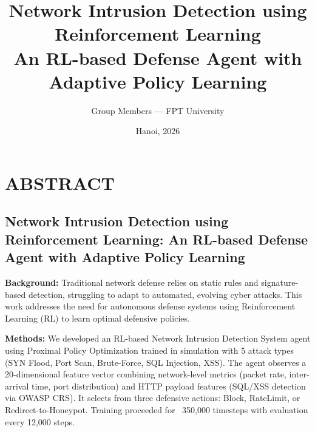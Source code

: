\documentclass[12pt,a4paper,twoside]{report}
\title{Network Intrusion Detection using Reinforcement Learning \\
An RL-based Defense Agent with Adaptive Policy Learning}
\author{Group Members --- FPT University}
\date{Hanoi, 2026}
\begin{document}
\maketitle
\newpage


\chapter*{ABSTRACT}

\section{Network Intrusion Detection using Reinforcement Learning: An RL-based Defense Agent with Adaptive Policy Learning}

\textbf{Background:} Traditional network defense relies on static rules and signature-based detection, struggling to adapt to automated, evolving cyber attacks. This work addresses the need for autonomous defense systems using Reinforcement Learning (RL) to learn optimal defensive policies.

\textbf{Methods:} We developed an RL-based Network Intrusion Detection System agent using Proximal Policy Optimization trained in simulation with 5 attack types (SYN Flood, Port Scan, Brute-Force, SQL Injection, XSS). The agent observes a 20-dimensional feature vector combining network-level metrics (packet rate, inter-arrival time, port distribution) and HTTP payload features (SQL/XSS detection via OWASP CRS). It selects from three defensive actions: Block, RateLimit, or Redirect-to-Honeypot. Training proceeded for ~350,000 timesteps with evaluation every 12,000 steps.
\end{document}

